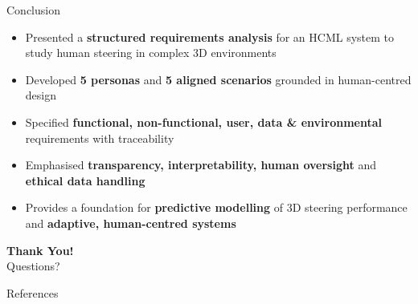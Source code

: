 \documentclass[aspectratio=169, 10pt]{beamer}
\begin{document}
\begin{frame}{Conclusion}
  \begin{itemize}
    \item Presented a \textbf{structured requirements analysis} for an HCML system
          to study human steering in complex 3D environments
    \item Developed \textbf{5 personas} and \textbf{5 aligned scenarios} grounded in
          human-centred design
    \item Specified \textbf{functional, non-functional, user, data \& environmental}
          requirements with traceability
    \item Emphasised \textbf{transparency, interpretability, human oversight} and
          \textbf{ethical data handling}
    \item Provides a foundation for \textbf{predictive modelling} of 3D steering
          performance and \textbf{adaptive, human-centred systems}
  \end{itemize}

  \vspace{1em}
  \centering
  {\Large\bfseries Thank You!}\\[0.3em]
  Questions?
\end{frame}

\begin{frame}[allowframebreak]{References}
  \printbibliography[heading=none]
\end{frame}
\end{document}
